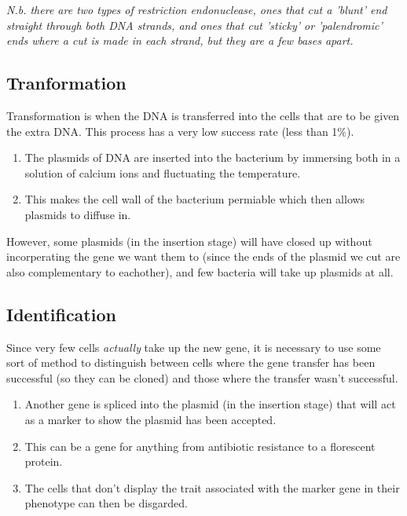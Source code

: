 \documentclass{article}
\begin{document}
\textit{N.b. there are two types of restriction endonuclease, ones that cut a
'blunt' end straight through both DNA strands, and ones that cut 'sticky' or
'palendromic' ends where a cut is made in each strand, but they are a few bases
apart.}

\subsection*{Tranformation}

Transformation is when the DNA is transferred into the cells that are to be
given the extra DNA. This process has a very low success rate (less than 1\%).

\begin{enumerate}
	
	\item The plasmids of DNA are inserted into the bacterium by immersing both
	in a solution of calcium ions and fluctuating the temperature.

	\item This makes the cell wall of the bacterium permiable which then allows
	plasmids to diffuse in.

\end{enumerate}

However, some plasmids (in the insertion stage) will have closed up without
incorperating the gene we want them to (since the ends of the plasmid we cut are
also complementary to eachother), and few bacteria will take up plasmids at all.

\subsection*{Identification}

Since very few cells {\it actually} take up the new gene, it is necessary to use
some sort of method to distinguish between cells where the gene transfer has
been successful (so they can be cloned) and those where the transfer wasn't
successful.

\begin{enumerate}
	
	\item Another gene is spliced into the plasmid (in the insertion stage) that
	will act as a marker to show the plasmid has been accepted.

	\item This can be a gene for anything from antibiotic resistance to a
	florescent protein.

	\item The cells that don't display the trait associated with the marker gene
	in their phenotype can then be disgarded.

\end{enumerate}
\end{document}
